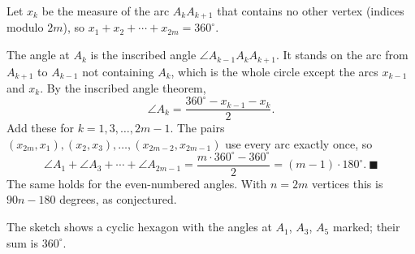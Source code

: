 Let $x_k$ be the measure of the arc $A_kA_{k+1}$ that contains no other vertex (indices modulo $2m$), so $x_1+x_2+\cdots+x_{2m}=360^\circ$.

The angle at $A_k$ is the inscribed angle $\angle A_{k-1}A_kA_{k+1}$. It stands on the arc from $A_{k+1}$ to $A_{k-1}$ not containing $A_k$, which is the whole circle except the arcs $x_{k-1}$ and $x_k$. By the inscribed angle theorem,
\[\angle A_k=\dfrac{360^\circ-x_{k-1}-x_k}{2}.\]
Add these for $k=1,3,\dots,2m-1$. The pairs $(x_{2m},x_1),(x_2,x_3),\dots,(x_{2m-2},x_{2m-1})$ use every arc exactly once, so
\[\angle A_1+\angle A_3+\cdots+\angle A_{2m-1}=\dfrac{m\cdot360^\circ-360^\circ}{2}=(m-1)\cdot180^\circ.\ \blacksquare\]
The same holds for the even-numbered angles. With $n=2m$ vertices this is $90n-180$ degrees, as conjectured.


The sketch shows a cyclic hexagon with the angles at $A_1$, $A_3$, $A_5$ marked; their sum is $360^\circ$.
